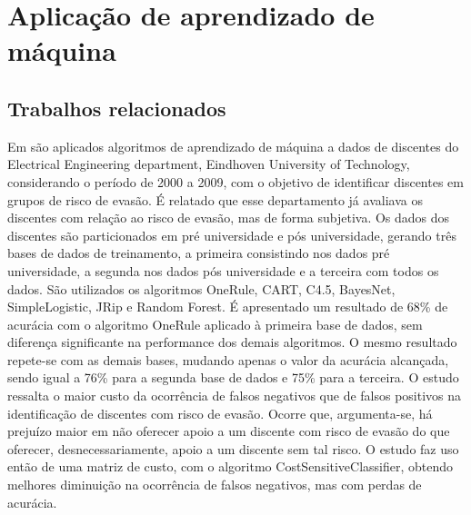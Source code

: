 \section{Aplicação de aprendizado de máquina}


\subsection*{Trabalhos relacionados}



Em \cite{Predicting_Students} são aplicados algoritmos de aprendizado de máquina a dados de discentes do Electrical Engineering department, Eindhoven University of Technology, considerando o período de 2000 a 2009, com o objetivo de identificar discentes em grupos de risco de evasão. É relatado que esse departamento já avaliava os discentes com relação ao risco de evasão, mas de forma subjetiva. Os dados dos discentes são particionados em pré universidade e pós universidade, gerando três bases de dados de treinamento, a primeira consistindo nos dados pré universidade, a segunda nos dados pós universidade e a terceira com todos os dados. São utilizados os algoritmos OneRule, CART, C4.5, BayesNet, SimpleLogistic, JRip e Random Forest. É apresentado um resultado de 68\% de acurácia com o algoritmo OneRule aplicado à primeira base de dados, sem diferença significante na performance dos demais algoritmos. O mesmo resultado repete-se com as demais bases, mudando apenas o valor da acurácia alcançada, sendo igual a 76\% para a segunda base de dados e 75\% para a terceira. O estudo ressalta o maior custo da ocorrência de falsos negativos que de falsos positivos na identificação de discentes com risco de evasão. Ocorre que, argumenta-se, há prejuízo maior em não oferecer apoio a um discente com risco de evasão do que oferecer, desnecessariamente, apoio a um discente sem tal risco. O estudo faz uso então de uma matriz de custo, com o algoritmo CostSensitiveClassifier, obtendo melhores diminuição na ocorrência de falsos negativos, mas com perdas de acurácia. 


